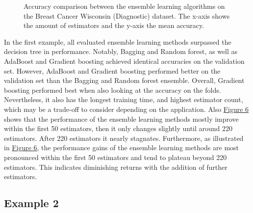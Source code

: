 

\begin{figure}[htbp]
    \centering
    \label{fig:bcw_comparison}
    \caption{
        Accuracy comparison between the ensemble learning algorithms on the Breast Cancer 
        Wisconsin (Diagnostic) dataset.
        The x-axis shows the amount of estimators and the y-axis the mean accuracy.
    }
\end{figure}

In the first example, all evaluated ensemble learning methods surpassed the decision tree in performance.
Notably, Bagging and Random forest, as well as AdaBoost and Gradient boosting achieved identical accuracies
on the validation set. However, AdaBoost and Gradient boosting performed better on the validation set than
the Bagging and Random forest ensemble.
Overall, Gradient boosting performed best when also looking at the accuracy on the folds. Nevertheless,
it also has the longest training time, and highest estimator count, which may be a trade-off to 
consider depending on the application.
Also \hyperref[fig:bcw_comparison]{Figure 6} shows that the performance of the ensemble learning 
methods mostly improve within the first 50 estimators, then it only changes slightly until around 220 estimators.
After 220 estimators it nearly stagnates.
Furthermore, as illustrated in \hyperref[fig:bcw_comparison]{Figure 6}, the performance gains of the ensemble
learning methods are most pronounced within the first 50 estimators and tend to plateau beyond 220 estimators.
This indicates diminishing returns with the addition of further estimators.

\newpage %
\subsection{Example 2}
\label{sec:example2}

